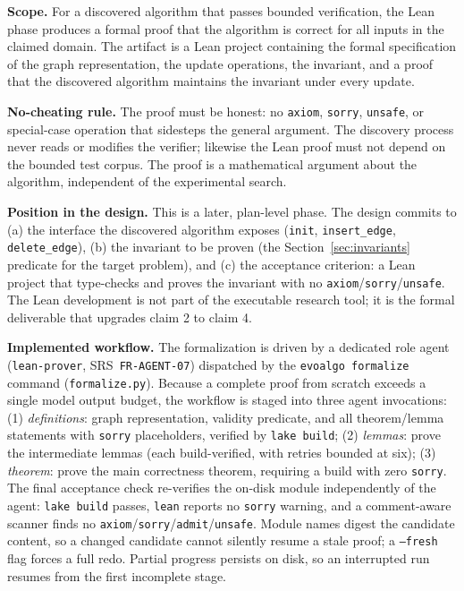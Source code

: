 \documentclass[12pt,a4paper]{article}
\begin{document}
\textbf{Scope.} For a discovered algorithm that passes bounded verification, the Lean phase produces a formal proof that the algorithm is correct for all inputs in the claimed domain. The artifact is a Lean project containing the formal specification of the graph representation, the update operations, the invariant, and a proof that the discovered algorithm maintains the invariant under every update.

\textbf{No-cheating rule.} The proof must be honest: no \texttt{axiom}, \texttt{sorry}, \texttt{unsafe}, or special-case operation that sidesteps the general argument. The discovery process never reads or modifies the verifier; likewise the Lean proof must not depend on the bounded test corpus. The proof is a mathematical argument about the algorithm, independent of the experimental search.

\textbf{Position in the design.} This is a later, plan-level phase. The design commits to (a) the interface the discovered algorithm exposes (\texttt{init}, \texttt{insert\_edge}, \texttt{delete\_edge}), (b) the invariant to be proven (the Section~\ref{sec:invariants} predicate for the target problem), and (c) the acceptance criterion: a Lean project that type-checks and proves the invariant with no \texttt{axiom}/\texttt{sorry}/\texttt{unsafe}. The Lean development is not part of the executable research tool; it is the formal deliverable that upgrades claim 2 to claim 4.

\textbf{Implemented workflow.} The formalization is driven by a dedicated role agent (\texttt{lean-prover}, SRS~\texttt{FR-AGENT-07}) dispatched by the \texttt{evoalgo formalize} command (\texttt{formalize.py}). Because a complete proof from scratch exceeds a single model output budget, the workflow is staged into three agent invocations: (1) \emph{definitions}: graph representation, validity predicate, and all theorem/lemma statements with \texttt{sorry} placeholders, verified by \texttt{lake build}; (2) \emph{lemmas}: prove the intermediate lemmas (each build-verified, with retries bounded at six); (3) \emph{theorem}: prove the main correctness theorem, requiring a build with zero \texttt{sorry}. The final acceptance check re-verifies the on-disk module independently of the agent: \texttt{lake build} passes, \texttt{lean} reports no \texttt{sorry} warning, and a comment-aware scanner finds no \texttt{axiom}/\texttt{sorry}/\texttt{admit}/\texttt{unsafe}. Module names digest the candidate content, so a changed candidate cannot silently resume a stale proof; a \texttt{--fresh} flag forces a full redo. Partial progress persists on disk, so an interrupted run resumes from the first incomplete stage.
\end{document}
